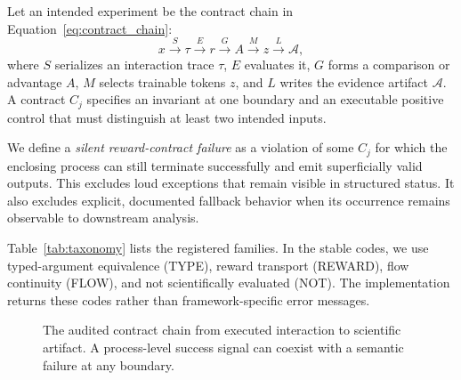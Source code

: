 \documentclass[10pt]{article}
\begin{document}
Let an intended experiment be the contract chain in
Equation~\ref{eq:contract_chain}:
\begin{equation}
  x \xrightarrow{S} \tau \xrightarrow{E} r
  \xrightarrow{G} A \xrightarrow{M} z
  \xrightarrow{L} \mathcal{A},
  \label{eq:contract_chain}
\end{equation}
where $S$ serializes an interaction trace $\tau$, $E$ evaluates it, $G$ forms a
comparison or advantage $A$, $M$ selects trainable tokens $z$, and $L$ writes
the evidence artifact $\mathcal{A}$.  A contract $C_j$ specifies an invariant
at one boundary and an executable positive control that must distinguish at
least two intended inputs.

We define a \emph{silent reward-contract failure} as a violation of some
$C_j$ for which the enclosing process can still terminate successfully and
emit superficially valid outputs.  This excludes loud exceptions that remain
visible in structured status.  It also excludes explicit, documented fallback
behavior when its occurrence remains observable to downstream analysis.

Table~\ref{tab:taxonomy} lists the registered families.  In the stable codes,
we use typed-argument equivalence (TYPE), reward transport (REWARD), flow
continuity (FLOW), and not scientifically evaluated (NOT).  The implementation returns
these codes rather than framework-specific error messages.

\begin{figure}[t]
\centering
{}
\caption{The audited contract chain from executed interaction to scientific
artifact.  A process-level success signal can coexist with a semantic failure
at any boundary.}
\label{fig:contract_chain}
\end{figure}
\end{document}
